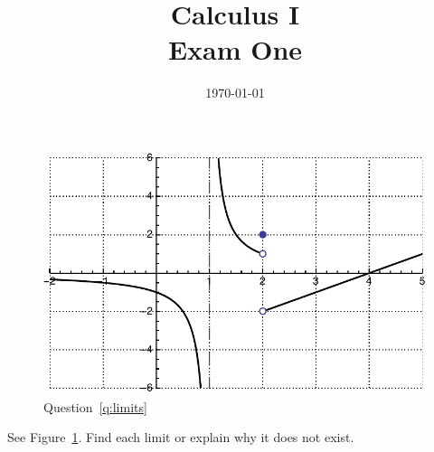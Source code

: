 \documentclass[letterpaper]{exam}
\title{Calculus I \\ Exam One}
\author{}
\date{\today}
\begin{document}
  \maketitle


  \begin{questions}

    \question 
    \label{q:limits}

      \begin{figure}[H]
        \centering
        \includegraphics[scale = 0.6]{limits.pdf}
        \caption{Question~\ref{q:limits}}
        \label{fig:limits}
      \end{figure}
      
      See Figure~\ref{fig:limits}. Find each limit or explain why it does not exist. 

\end{questions}
\end{document}
